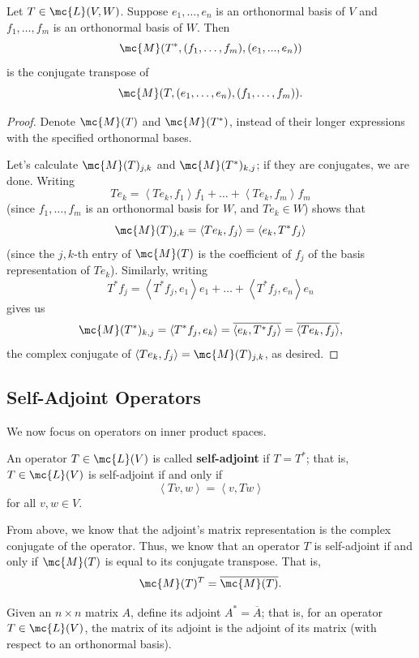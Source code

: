 \documentclass[math0540-lecture-notes.tex]{subfiles}
\begin{document}
\begin{proposition}[Matrix of $T^*$]{}
  Let $T\in \mc{L}(V,W)$. Suppose $e_1,\ldots,e_n$ is an orthonormal basis of $V$ and
  $f_1,\ldots,f_m$ is an orthonormal basis of $W$. Then \[
    \mc{M}(T^*,(f_1,\ldots,f_m),(e_1,...,e_n))
  \] is the conjugate transpose of \[
  \mc{M}(T,(e_1,\ldots,e_n), (f_1,\ldots,f_m))
  .\] 
\end{proposition}
\begin{proof}[Proof]
  Denote $\mc{M}(T)$ and $\mc{M}(T^*)$, instead of their longer expressions with the specified
  orthonormal bases.

  Let's calculate $\mc{M}(T)_{j,k}$ and $\mc{M}(T^*)_{k,j}$; if they are conjugates, we are done.
  Writing \[
    Te_k=\left<Te_k,f_1 \right>f_1+\ldots+\left<Te_k,f_m \right> f_m 
  \] (since $f_1,\ldots,f_m$ is an orthonormal basis for $W$, and $Te_k\in W$) shows that \[
    \mc{M}(T)_{j,k}=\left<Te_k,f_j \right> =\left<e_k,T^*f_j \right> 
    \] (since the $j,k$-th entry of $\mc{M}(T)$ is the coefficient of $f_j$ of the basis
    representation of $Te_k$). Similarly, writing \[
    T^*f_j=\left<T^*f_j,e_1 \right> e_1+\ldots+\left<T^*f_j,e_n \right> e_n
  \] gives us \[
    \mc{M}(T^*)_{k,j}=\left<T^*f_j,e_k \right> =\overline{\left<e_k,T^*f_j \right>
    }=\overline{\left<Te_k,f_j \right> }
  ,\] the complex conjugate of $\left<Te_k,f_j \right> =\mc{M}(T)_{j,k}$, as desired.
\end{proof}

\subsection{Self-Adjoint Operators}
We now focus on operators on inner product spaces.
\begin{definition}{}
  An operator $T\in \mc{L}(V)$ is called \textbf{self-adjoint} if $T=T^*$; that is, $T\in \mc{L}(V)$
  is self-adjoint if and only if \[
    \left<Tv,w \right> =\left<v,Tw \right> 
  \] for all $v,w\in V$.
\end{definition}

From above, we know that the adjoint's matrix representation is the complex conjugate of the
operator. Thus, we know that an operator $T$ is self-adjoint if and only if $\mc{M}(T)$ is equal to
its conjugate transpose. That is, \[
  \mc{M}(T)^T=\overline{\mc{M}(T)}
.\] 

\begin{definition}{}
  Given an $n\times n$ matrix $A$, define its adjoint $A^*=\overline{A}$; that is, for an operator
  $T\in \mc{L}(V)$, the matrix of its adjoint is the adjoint of its matrix (with respect to an
  orthonormal basis).
\end{definition}
\end{document}
